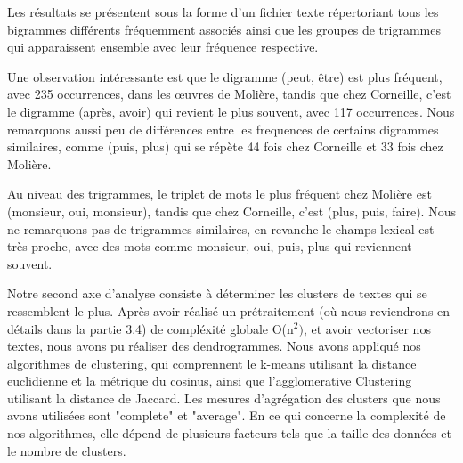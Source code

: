 Les résultats se présentent sous la forme d'un fichier texte répertoriant tous
les bigrammes différents fréquemment associés ainsi que les groupes de
trigrammes qui apparaissent ensemble avec leur fréquence respective.
	
Une observation intéressante est que le digramme (peut, être) est plus fréquent,
avec 235 occurrences, dans les œuvres de Molière, tandis que chez Corneille,
c'est le digramme (après, avoir) qui revient le plus souvent, avec 117
occurrences. Nous remarquons aussi peu de différences entre les frequences de
certains digrammes similaires, comme (puis, plus) qui se répète 44 fois chez
Corneille et 33 fois chez Molière.
	
Au niveau des trigrammes, le triplet de mots le plus fréquent chez Molière est
(monsieur, oui, monsieur), tandis que chez Corneille, c'est (plus, puis, faire).
Nous ne remarquons pas de trigrammes similaires, en revanche le champs lexical
est très proche, avec des mots comme monsieur, oui, puis, plus qui reviennent
souvent.

\vspace{\baselineskip}

\hspace{0,5cm}Notre second axe d'analyse consiste à déterminer les clusters de
textes qui se ressemblent le plus. Après avoir réalisé un prétraitement (où nous
reviendrons en détails dans la partie 3.4) de compléxité globale O(n\(^2)\), et
avoir vectoriser nos textes, nous avons pu réaliser des dendrogrammes.
Nous avons appliqué nos algorithmes de clustering, qui comprennent le
k-means utilisant la distance euclidienne et la métrique du cosinus, ainsi que
l'agglomerative Clustering utilisant la distance de Jaccard. Les mesures
d'agrégation des clusters que nous avons utilisées sont "complete" et
"average". En ce qui concerne la complexité de nos algorithmes, elle dépend de
plusieurs facteurs tels que la taille des données et le nombre de clusters.


